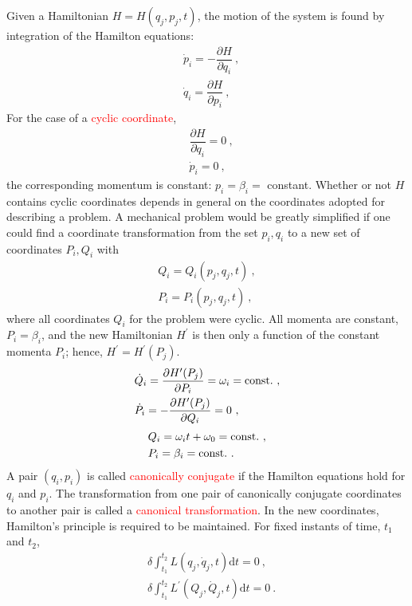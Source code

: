 \documentclass[11pt,a4paper]{article}
\newcommand{\dif}{\mathrm{d}}
\begin{document}
\cite{greiner2009classical} Given a Hamiltonian $H = H(q_j, p_j, t)$, the motion of the system is found by integration of the Hamilton equations:
\begin{align}
& \dot{p}_i = -\dfrac{\partial H}{\partial q_i} ~, \\
& \dot{q}_i = \dfrac{\partial H}{\partial p_i} ~, 
\end{align}
For the case of a \textcolor{red}{cyclic coordinate}, 
\begin{align}
& \dfrac{\partial H}{\partial q_i} = 0 ~, \\
& \dot{p}_i = 0 ~, 
\end{align}
the corresponding momentum is constant: $p_i = \beta_i =$ constant. Whether or not $H$ contains cyclic coordinates depends in general on the coordinates adopted for describing a problem. A mechanical problem would be greatly simplified if one could find a coordinate transformation from the set $p_i, q_i$ to a new set of coordinates $P_i, Q_i$ with
\begin{align}
Q_i = Q_i(p_j, q_j, t) ~, \\
P_i = P_i(p_j, q_j, t) ~,
\end{align}
where all coordinates $Q_i$ for the problem were cyclic. All momenta are constant, $P_i = \beta_i$, and the new Hamiltonian $H^\prime$ is then only a function of the constant momenta $P_i$; hence, $H^\prime =H^\prime(P_j)$.
\begin{align}
& \dot{Q}_i = \dfrac{\partial H^\prime(P_j)}{\partial P_i}  = \omega_i = \rm const. ~, \\
& \dot{P}_i = -\dfrac{\partial H^\prime(P_j)}{\partial Q_i} = 0 ~,
\end{align}
\begin{align}
& Q_i =  \omega_i t + \omega_0 = \rm const. ~, \\
& P_i = \beta_i = \rm const. ~.
\end{align}
A pair $(q_i, p_i)$ is called \textcolor{red}{canonically conjugate} if the Hamilton equations hold for $q_i$ and $p_i$. The transformation from one pair of canonically conjugate coordinates to another pair is called a \textcolor{red}{canonical transformation}. In the new coordinates, Hamilton's principle is required to be maintained. For fixed instants of time, $t_1$ and $t_2$,
\begin{align}
& \delta \int_{t_1}^{t_2} L(q_j, \dot{q}_j, t) \dif t= 0 ~, \\
& \delta \int_{t_1}^{t_2} L^\prime(Q_j, \dot{Q}_j, t) \dif t = 0 ~.
\end{align}
\end{document}
